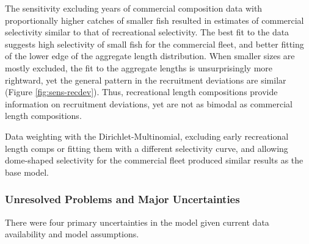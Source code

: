 \documentclass[11pt,
  english,
  a4paper,
]{article}
\begin{document}

The sensitivity excluding years of commercial composition data with proportionally higher catches of smaller fish resulted in estimates of commercial selectivity similar to that of recreational selectivity. The best fit to the data suggests high selectivity of small fish for the commercial fleet, and better fitting of the lower edge of the aggregate length distribution. When smaller sizes are mostly excluded, the fit to the aggregate lengths is unsurprisingly more rightward, yet the general pattern in the recruitment deviations are similar (Figure \ref{fig:sens-recdev}). Thus, recreational length compositions provide information on recruitment deviations, yet are not as bimodal as commercial length compositions.

\leavevmode\tagmcend\tagstructend\par


Data weighting with the Dirichlet-Multinomial, excluding early recreational length comps or fitting them with a different selectivity curve, and allowing dome-shaped selectivity for the commercial fleet produced similar results as the base model.

\leavevmode\tagmcend\tagstructend\par


\hypertarget{unresolved-problems-and-major-uncertainties}{%
\subsubsection{Unresolved Problems and Major Uncertainties}\label{unresolved-problems-and-major-uncertainties}}

\leavevmode\tagmcend\tagstructend

There were four primary uncertainties in the model given current data availability and model assumptions.
\end{document}
